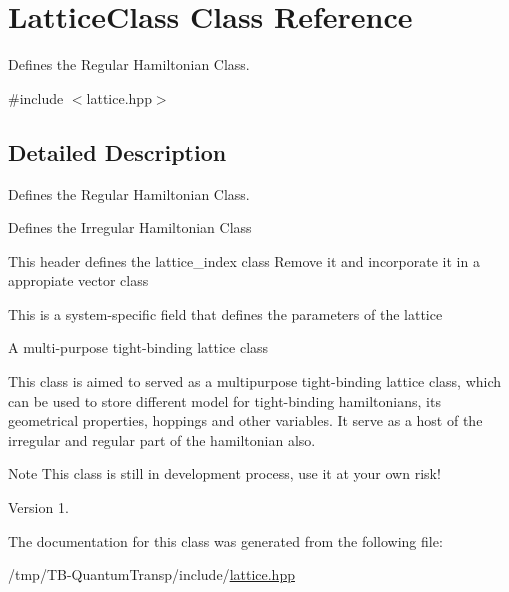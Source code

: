 \hypertarget{classLatticeClass}{}\section{Lattice\+Class Class Reference}
\label{classLatticeClass}


Defines the Regular Hamiltonian Class.  




{\ttfamily \#include $<$lattice.\+hpp$>$}



\subsection{Detailed Description}
Defines the Regular Hamiltonian Class. 

Defines the Irregular Hamiltonian Class

This header defines the lattice\+\_\+index class  Remove it and incorporate it in a appropiate vector class

This is a system-\/specific field that defines the parameters of the lattice

A multi-\/purpose tight-\/binding lattice class

This class is aimed to served as a multipurpose tight-\/binding lattice class, which can be used to store different model for tight-\/binding hamiltonians, it\textquotesingle{}s geometrical properties, hoppings and other variables. It serve as a host of the irregular and regular part of the hamiltonian also.

\begin{DoxyNote}{Note}
This class is still in development process, use it at your own risk!
\end{DoxyNote}
\begin{DoxyVersion}{Version}
1. 
\end{DoxyVersion}


The documentation for this class was generated from the following file\+:\begin{DoxyCompactItemize}
\item 
/tmp/\+T\+B-\/\+Quantum\+Transp/include/\hyperlink{lattice_8hpp}{lattice.\+hpp}\end{DoxyCompactItemize}
